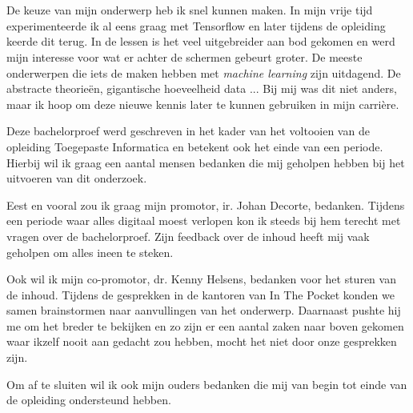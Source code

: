 
\chapter*{}
\label{ch:voorwoord}


De keuze van mijn onderwerp heb ik snel kunnen maken. In mijn vrije tijd experimenteerde ik al eens graag met Tensorflow en later tijdens de opleiding keerde dit terug. In de lessen is het veel uitgebreider aan bod gekomen en werd mijn interesse voor wat er achter de schermen gebeurt groter. De meeste onderwerpen die iets de maken hebben met \textit{machine learning} zijn uitdagend. De abstracte theorieën, gigantische hoeveelheid data ... Bij mij was dit niet anders, maar ik hoop om deze nieuwe kennis later te kunnen gebruiken in mijn carrière.

Deze bachelorproef werd geschreven in het kader van het voltooien van de opleiding Toegepaste Informatica en betekent ook het einde van een periode. Hierbij wil ik graag een aantal mensen bedanken die mij geholpen hebben bij het uitvoeren van dit onderzoek.

Eest en vooral zou ik graag mijn promotor, ir. Johan Decorte, bedanken. Tijdens een periode waar alles digitaal moest verlopen kon ik steeds bij hem terecht met vragen over de bachelorproef. Zijn feedback over de inhoud heeft mij vaak geholpen om alles ineen te steken.

Ook wil ik mijn co-promotor, dr. Kenny Helsens, bedanken voor het sturen van de inhoud. Tijdens de gesprekken in de kantoren van In The Pocket konden we samen brainstormen naar aanvullingen van het onderwerp. Daarnaast pushte hij me om het breder te bekijken en zo zijn er een aantal zaken naar boven gekomen waar ikzelf nooit aan gedacht zou hebben, mocht het niet door onze gesprekken zijn.

Om af te sluiten wil ik ook mijn ouders bedanken die mij van begin tot einde van de opleiding ondersteund hebben.